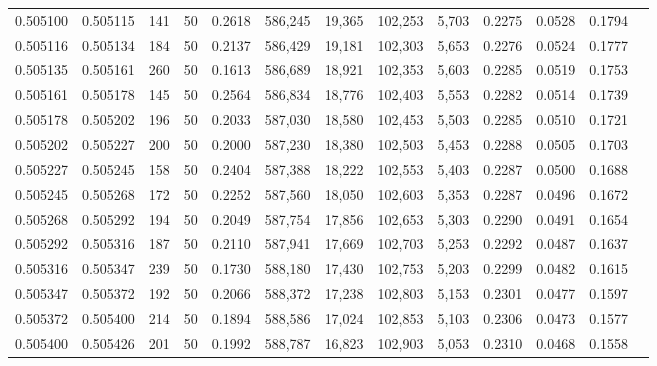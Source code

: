 \begin{tabular}{rrrrrrrrrrrrr}
0.505100 & 0.505115 & 141 &  50 &                                     0.2618 & 586,245 &  19,365 & 102,253 &   5,703 & 0.2275 & 0.0528 & 0.1794 \\
0.505116 & 0.505134 & 184 &  50 &                                     0.2137 & 586,429 &  19,181 & 102,303 &   5,653 & 0.2276 & 0.0524 & 0.1777 \\
0.505135 & 0.505161 & 260 &  50 &                                     0.1613 & 586,689 &  18,921 & 102,353 &   5,603 & 0.2285 & 0.0519 & 0.1753 \\
0.505161 & 0.505178 & 145 &  50 &                                     0.2564 & 586,834 &  18,776 & 102,403 &   5,553 & 0.2282 & 0.0514 & 0.1739 \\
0.505178 & 0.505202 & 196 &  50 &                                     0.2033 & 587,030 &  18,580 & 102,453 &   5,503 & 0.2285 & 0.0510 & 0.1721 \\
0.505202 & 0.505227 & 200 &  50 &                                     0.2000 & 587,230 &  18,380 & 102,503 &   5,453 & 0.2288 & 0.0505 & 0.1703 \\
0.505227 & 0.505245 & 158 &  50 &                                     0.2404 & 587,388 &  18,222 & 102,553 &   5,403 & 0.2287 & 0.0500 & 0.1688 \\
0.505245 & 0.505268 & 172 &  50 &                                     0.2252 & 587,560 &  18,050 & 102,603 &   5,353 & 0.2287 & 0.0496 & 0.1672 \\
0.505268 & 0.505292 & 194 &  50 &                                     0.2049 & 587,754 &  17,856 & 102,653 &   5,303 & 0.2290 & 0.0491 & 0.1654 \\
0.505292 & 0.505316 & 187 &  50 &                                     0.2110 & 587,941 &  17,669 & 102,703 &   5,253 & 0.2292 & 0.0487 & 0.1637 \\
0.505316 & 0.505347 & 239 &  50 &                                     0.1730 & 588,180 &  17,430 & 102,753 &   5,203 & 0.2299 & 0.0482 & 0.1615 \\
0.505347 & 0.505372 & 192 &  50 &                                     0.2066 & 588,372 &  17,238 & 102,803 &   5,153 & 0.2301 & 0.0477 & 0.1597 \\
0.505372 & 0.505400 & 214 &  50 &                                     0.1894 & 588,586 &  17,024 & 102,853 &   5,103 & 0.2306 & 0.0473 & 0.1577 \\
0.505400 & 0.505426 & 201 &  50 &                                     0.1992 & 588,787 &  16,823 & 102,903 &   5,053 & 0.2310 & 0.0468 & 0.1558 \\

\end{tabular}
